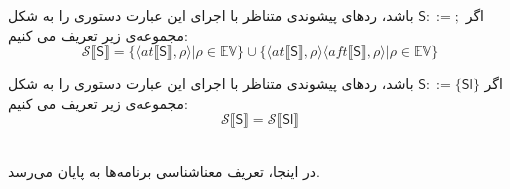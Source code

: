 \begin{defn}
	اگر $         \mathsf{S} ::=;  $ باشد، ردهای پیشوندی متناظر با اجرای این عبارت‌ دستوری را به شکل مجموعه‌ی زیر تعریف می کنیم:
	$$\mathcal{S} \llbracket\mathsf{S}\rrbracket = \{ \langle at\llbracket\mathsf{S}\rrbracket , \rho \rangle | \rho \in \mathbb{EV}       \} \cup     \{ \langle at\llbracket\mathsf{S}\rrbracket , \rho \rangle \langle aft\llbracket\mathsf{S}\rrbracket , \rho \rangle | \rho \in \mathbb{EV}       \}             $$  
	
	
	اگر $         \mathsf{S} ::=\{\mathsf{Sl}\}  $ باشد، ردهای پیشوندی متناظر با اجرای این عبارت‌ دستوری را به شکل مجموعه‌ی زیر تعریف می کنیم:
	$$\mathcal{S} \llbracket\mathsf{S}\rrbracket = \mathcal{S} \llbracket\mathsf{Sl}\rrbracket $$   \\
\end{defn}
در اینجا، تعریف معناشناسی برنامه‌ها به پایان می‌رسد.

